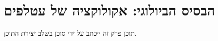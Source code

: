 \section{הבסיס הביולוגי: אקולוקציה של עטלפים}
\label{sec:bio_basis}

תוכן פרק זה ייכתב על-ידי סוכן  בשלב יצירת התוכן.
